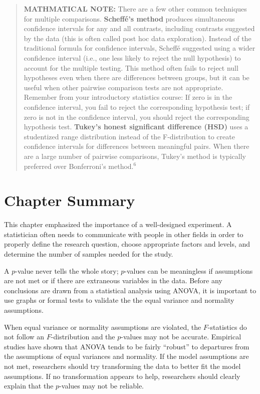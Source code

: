 \documentclass[
]{book}
\begin{document}
\begin{quote}
\textbf{MATHMATICAL NOTE:} There are a few other common techniques for multiple comparisons. \textbf{Scheffé's method} produces simultaneous confidence intervals for any and all contrasts, including contrasts suggested by the data (this is often called post hoc data exploration). Instead of the traditional formula for confidence intervals, Scheffé suggested using a wider confidence interval (i.e., one less likely to reject the null hypothesis) to account for the multiple testing. This method often fails to reject null hypotheses even when there are differences between groups, but it can be useful when other pairwise comparison tests are not appropriate. Remember from your introductory statistics course: If zero is in the confidence interval, you fail to reject the corresponding hypothesis test; if zero is not in the confidence interval, you should reject the corresponding hypothesis test. \textbf{Tukey's honest significant difference (HSD)} uses a studentized range distribution instead of the F-distribution to create confidence intervals for differences between meaningful pairs. When there are a large number of pairwise comparisons, Tukey's method is typically preferred over Bonferroni's method.\(^6\)
\end{quote}

\hypertarget{chapter-summary-3}{%
\section{Chapter Summary}\label{chapter-summary-3}}

This chapter emphasized the importance of a well-designed experiment. A statistician often needs to communicate with people in other fields in order to properly define the research question, choose appropriate factors and levels, and determine the number of samples needed for the study.

A \(p\)-value never tells the whole story; \(p\)-values can be meaningless if assumptions are not met or if there are extraneous variables in the data. Before any conclusions are drawn from a statistical analysis using ANOVA, it is important to use graphs or formal tests to validate the the equal variance and normality assumptions.

When equal variance or normality assumptions are violated, the \(F\)-statistics do not follow an \(F\)-distribution and the \(p\)-values may not be accurate. Empirical studies have shown that ANOVA tends to be fairly ``robust'' to departures from the assumptions of equal variances and normality. If the model assumptions are not met, researchers should try transforming the data to better fit the model assumptions. If no transformation appears to help, researchers should clearly explain that the \(p\)-values may not be reliable.
\end{document}
